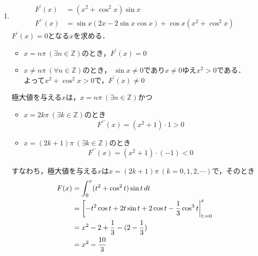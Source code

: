 



    
\maketitle

\begin{enumerate}[(1)]
    \item 
    \begin{align}
        F^\prime (x)&=(x^2+\cos^2 x)\sin x\\
        F^{\prime\prime} (x)&=\sin x(2x-2\sin x\cos x)+\cos x(x^2+\cos^2x)
    \end{align}
    $F^\prime (x)=0$となる$x$を求める．
    \begin{itemize}
        \item $x=n\pi\ (\exists n\in \mathbb{Z})$のとき，$F^\prime (x)=0$
        \item $x\ne n\pi\ (\forall n\in \mathbb{Z})$のとき，
        $\sin x\ne 0$であり$x\ne 0$ゆえ$x^2>0$である．\\
        よって$x^2+\cos^2x>0$で，$F^\prime (x)\ne 0$
    \end{itemize}
    極大値を与える$x$は，$x=n\pi\ (\exists n\in \mathbb{Z})$かつ
    \begin{itemize}
        \item $x=2k\pi\ (\exists k\in\mathbb{Z})$のとき\\
        \begin{equation}
            F^{\prime\prime} (x)=(x^2+1)\cdot 1>0
        \end{equation}
        \item $x=(2k+1)\pi\ (\exists k\in\mathbb{Z})$のとき\\
        \begin{equation}
            F^{\prime\prime} (x)=(x^2+1)\cdot (-1)<0
        \end{equation}
    \end{itemize}
    すなわち，極大値を与える$x$は$x=(2k+1)\pi\ (k=0,1,2,\cdots)$で，そのとき
    \begin{align}
        F(x)
        &=\int_0^{x}(t^2+\cos^2t)\sin t\dd{t}\\
        &=\eval[-t^2\cos t+2t\sin t+2\cos t-\frac{1}{3}\cos^3 t|_{t:=0}^{x}\\
        &=x^2-2+\frac{1}{3}-(2-\frac{1}{3})\\
        &=x^2-\frac{10}{3}
    \end{align}

\end{enumerate}

